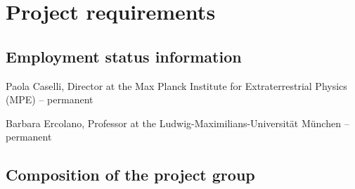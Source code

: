 \documentclass[10pt,fleqn,twoside]{article}
\begin{document}
% 
% 
% 
% 
% 
% 
% 

\section{Project requirements}
\renewcommand{\leftmark}{\sc Project requirements}

\subsection{Employment status information}

Paola Caselli, Director at the Max Planck Institute for Extraterrestrial Physics (MPE) -- permanent 

Barbara Ercolano, Professor at the Ludwig-Maximilians-Universit\"at
M\"unchen -- permanent



\subsection{Composition of the project group}
\end{document}
